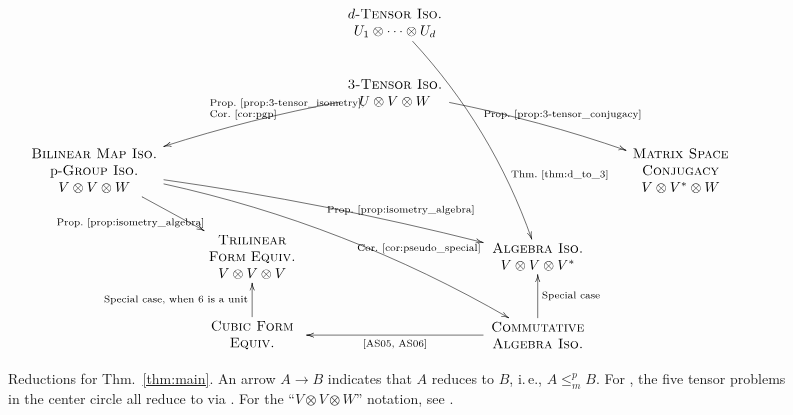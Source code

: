 \newif\iffgs
\fgsfalse

\begin{figure}[!htbp]
\[
\hspace{-0.35in}
\xymatrix{
 & & \parbox{1in}{\centering $d$\algprobm{-Tensor Iso.} \\ $U_1 \otimes \dotsb \otimes U_d$} \ar@/^1pc/[dddr]^(0.7){\text{\Thm{thm:d_to_3}}}\\
 & & \ar@/_/[dll]_{\parbox{0.5in}{\scriptsize \text{\Prop{prop:3-tensor_isometry},} \\ \text{\Cor{cor:pgp}}}} \parbox{1in}{\centering \algprobm{3-Tensor Iso.} \\ $U \otimes V \otimes W$}\ar@/^/[drr]^{\text{Prop.~\ref{prop:3-tensor_conjugacy}}} & & \\
\parbox{1.3in}{\centering \algprobm{Bilinear Map Iso.} \\ p-\algprobm{Group Iso.} \\ $V \otimes V \otimes W$} \iffgs \ar@/_/[urr]_{\text{\cite{FGS19}}}\fi \ar[dr]_{\text{Prop.~\ref{prop:isometry_algebra}}} \ar@/^/[drrr]^(.65){\text{Prop.~\ref{prop:isometry_algebra}}} \ar@/^1.4pc/[ddrrr]^(.65){\text{\Cor{cor:pseudo_special}}} & & & &  \iffgs \ar@/^/[ull]^{\text{\cite{FGS19}}}\fi \parbox{1in}{\centering \algprobm{Matrix Space} \\ \algprobm{Conjugacy} \\ $V \otimes V^* \otimes W$} \\
&  \parbox{1in}{\centering \algprobm{Trilinear} \\ \algprobm{Form} \algprobm{Equiv.} \\ $V \otimes V \otimes V$} \iffgs \ar[uur]_(.65){\text{\cite{FGS19}}}\fi & & \iffgs \ar[uul]_(.35){\text{\cite{FGS19}}}\fi \parbox{1in}{\centering \algprobm{Algebra Iso.} \\ $V \otimes V \otimes V^*$} &  \\
 & \parbox{1in}{\centering \algprobm{Cubic Form} \ar[u]^(.45){\text{Special case, when $6$ is a unit}} \\ \algprobm{Equiv.}} & & \ar[ll]^{\text{\cite{AS05, AS06}}} \ar[u]_{\text{Special case}} \parbox{1in}{\centering \algprobm{Commutative} \\ \algprobm{Algebra Iso.}}
 }
\]

\caption{\label{fig:main} Reductions for Thm.~\ref{thm:main}. An arrow $A \to B$ indicates that $A$ reduces to $B$, i.\,e., $A \leq_m^p B$. For , the five tensor problems in the center circle all reduce to \ThreeTI via \cite{FGS19}. For the ``$V \otimes V \otimes W$'' notation, see . } 
\end{figure}


